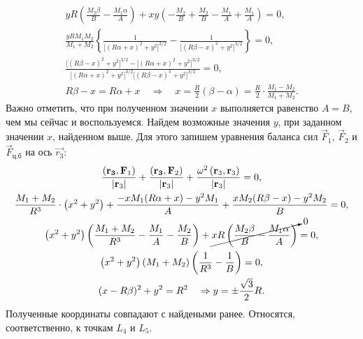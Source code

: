 {{\begin{gather*}
		 yR \left( \frac{M_2 \beta}{B} - \frac{M_1 \alpha}{A}\right) + xy \left( - \frac{M_2}{B} + \frac{M_2}{B} - \frac{M_1}{A} + \frac{M_1}{A} \right) = 0,\\
		 \frac{yRM_1M_2}{M_1 + M_2} \left\{ \frac{1}{\big[ (R \alpha + x)^2 + y^2 \big]^{3/2}} - \frac{1}{\big[ (R \beta - x)^2 + y^2 \big]^{3/2}} \right\} = 0,\\
		 \frac{\big[ (R \beta - x)^2 + y^2 \big]^{3/2} - \big[ (R \alpha + x)^2 + y^2 \big]^{3/2}}{\big[ (R \alpha + x)^2 + y^2 \big]^{3/2}\big[ (R \beta - x)^2 + y^2 \big]^{3/2}} = 0,\\
		 R \beta - x = R \alpha + x \quad \Rightarrow \quad x = \frac{R}{2} \left( \beta - \alpha \right) = \frac{R}{2} \cdot \frac{M_1 - M_2}{M_1 + M_2}. 
		 \end{gather*}
	Важно отметить, что при полученном значении $x$ выполняется равенство $A = B$, чем мы сейчас и воспользуемся. Найдем возможные значения $y$, при заданном значении $x$, найденном выше. Для этого запишем уравнения баланса сил  $\vec{F}_1$, $\vec{F}_2$ и $\vec{F}_\text{ц.б}$ на ось $\vec{r_3}$:
	\begin{gather*}
		\frac{ \left( \vec{r_3},  \vec{F}_1 \right)}{\left| \vec{r}_3 \right|} + \frac{ \left( \vec{r_3}, \vec{F}_2 \right)}{\left| \vec{r}_3\right|} + \frac{\omega^2 \left(\vec{r}_3, \vec{r}_3\right)}{\left| \vec{r}_3\right|} = 0,\\
		\frac{M_1 + M_2}{R^3} \cdot \left( x^2 + y^2 \right) + \frac{-x M_1 (R \alpha + x) - y^2 M_1}{A} + \frac{ x M_2 ( R \beta - x) - y^2 M_2}{B} = 0,\\
		\left( x^2 + y^2 \right) \left(  \frac{M_1 + M_2}{R^3} - \frac{M_1}{A} - \frac{M_2}{B} \right) + \cancelto{0}{xR \left( \frac{M_2 \beta}{B} - \frac{M_1 \alpha}{A} \right)} = 0,\\
		\left( x^2 + y^2 \right)(M_1 + M_2) \left( \frac{1}{R^3} - \frac{1}{B} \right) = 0,\\
		(x - R \beta)^2 + y^2 = R^2 \quad \Rightarrow y = \pm \frac{\sqrt{3}}{2} R.
	\end{gather*}
	Полученные координаты совпадают с найдеными ранее. Относятся, соответственно, к точкам $L_4$ и $L_5$.
}
}
